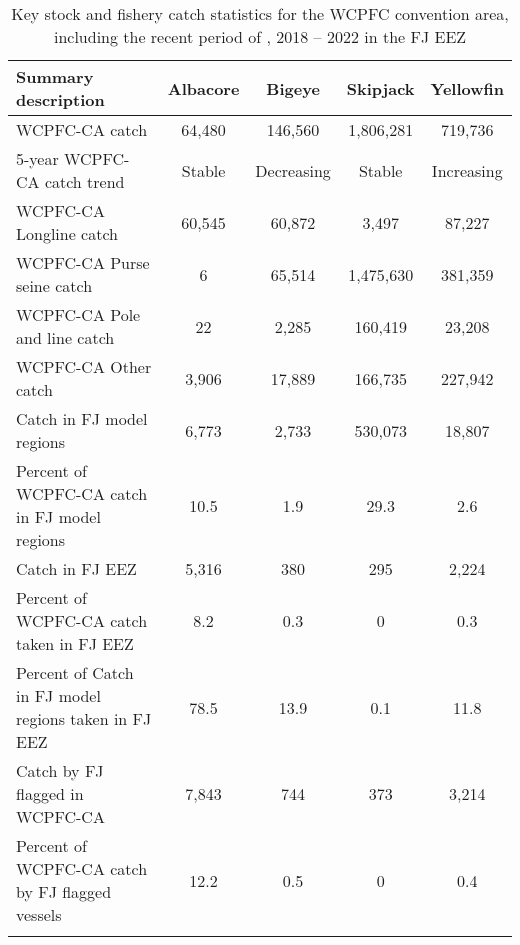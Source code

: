 \begin{longtable}{lcccc}
\caption{Key stock and fishery catch statistics for the WCPFC convention area, including the recent period of , 2018 -- 2022 in the FJ EEZ} \\ 
  \hline
Summary description & Albacore & Bigeye & Skipjack & Yellowfin \\ 
  \hline
WCPFC-CA catch & 64,480 & 146,560 & 1,806,281 & 719,736 \\ 
  5-year WCPFC-CA catch trend & Stable & Decreasing & Stable & Increasing \\ 
  WCPFC-CA Longline catch & 60,545 & 60,872 & 3,497 & 87,227 \\ 
  WCPFC-CA Purse seine catch & 6 & 65,514 & 1,475,630 & 381,359 \\ 
  WCPFC-CA Pole and line catch & 22 & 2,285 & 160,419 & 23,208 \\ 
  WCPFC-CA Other catch & 3,906 & 17,889 & 166,735 & 227,942 \\ 
  Catch in FJ model regions & 6,773 & 2,733 & 530,073 & 18,807 \\ 
  Percent of WCPFC-CA catch in FJ model regions & 10.5 & 1.9 & 29.3 & 2.6 \\ 
   \hline
Catch in FJ EEZ & 5,316 & 380 & 295 & 2,224 \\ 
  Percent of WCPFC-CA catch taken in FJ EEZ & 8.2 & 0.3 & 0 & 0.3 \\ 
  Percent of Catch in FJ model regions taken in FJ EEZ & 78.5 & 13.9 & 0.1 & 11.8 \\ 
  Catch by FJ flagged in WCPFC-CA & 7,843 & 744 & 373 & 3,214 \\ 
  Percent of WCPFC-CA catch by FJ flagged vessels & 12.2 & 0.5 & 0 & 0.4 \\ 
  \hline
\label{cat_sum_tab}
\end{longtable}
